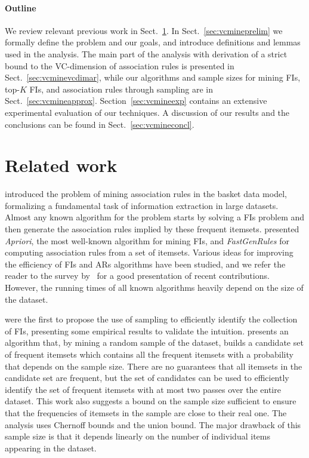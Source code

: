 \paragraph{Outline}
We review relevant previous work in Sect.~\ref{sec:vcmineprevwork}. In
Sect.~\ref{sec:vcmineprelim} we formally define the problem
and our goals, and introduce definitions and lemmas used in the analysis. The
main part of the analysis with derivation of a strict bound to the VC-dimension
of association rules is presented in Sect.~\ref{sec:vcminevcdimar}, while our
algorithms and sample sizes for mining FIs, top-$K$ FIs, and association rules
through sampling are in Sect.~\ref{sec:vcmineapprox}. Section~\ref{sec:vcmineexp} contains
an extensive experimental evaluation of our techniques. A discussion of our
results and the conclusions can be found in Sect.~\ref{sec:vcmineconcl}.

\section{Related work}\label{sec:vcmineprevwork}
\citet{AgrawalIS93} introduced the problem of mining association
rules in the basket data model, formalizing a fundamental task of information
extraction in large datasets. Almost any known algorithm for the problem starts
by solving a FIs problem and then generate the association rules implied by
these frequent itemsets. \citet{AgrawalS94} presented
\emph{Apriori}, the most well-known algorithm for mining FIs, and
\emph{FastGenRules} for computing association rules from a set of itemsets.
Various ideas for improving the efficiency of FIs and ARs algorithms have been
studied, and we refer the reader to the survey by~\citet{CeglarR06} for a good presentation of recent contributions.
However, the running times of all known algorithms heavily depend on the size of
the dataset.  

\citet{MannilaTV94} were the first to propose the 
use of sampling to efficiently identify the collection of FIs, presenting some empirical
results to validate the intuition. \citet{Toivonen96} presents an
algorithm that, by mining a random sample of the dataset, builds a candidate set
of frequent itemsets which contains all the frequent itemsets with a probability
that depends on the sample size. There are no guarantees that all itemsets
in the candidate set are frequent, but the set of candidates can be used to
efficiently identify the set of frequent itemsets with at most two passes over
the entire dataset. This work also suggests a bound on the sample size sufficient
to ensure that the frequencies of itemsets in the sample are close to their real
one. The analysis uses Chernoff bounds and the union bound. The major drawback
of this sample size is that it depends linearly on the number of individual
items appearing in the dataset.

